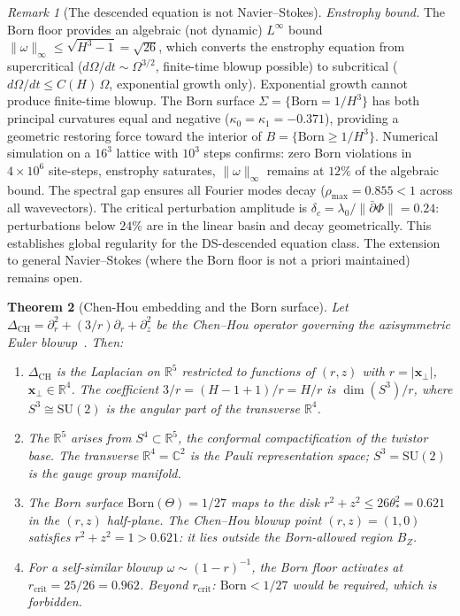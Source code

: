 \documentclass[11pt,a4paper]{article}
\newtheorem{theorem}{Theorem}[section]
\theoremstyle{definition}
\theoremstyle{remark}
\newtheorem{remark}[theorem]{Remark}
\newcommand{\C}{\mathbb{C}}
\newcommand{\R}{\mathbb{R}}
\newcommand{\SU}{\mathrm{SU}}
\begin{document}
\begin{remark}[The descended equation is not Navier--Stokes]
\emph{Enstrophy bound.} The Born floor provides an algebraic (not dynamic) $L^\infty$ bound $\|\omega\|_\infty\leq\sqrt{H^3-1}=\sqrt{26}$, which converts the enstrophy equation from supercritical ($d\Omega/dt\sim\Omega^{3/2}$, finite-time blowup possible) to subcritical ($d\Omega/dt\leq C(H)\,\Omega$, exponential growth only). Exponential growth cannot produce finite-time blowup. The Born surface $\Sigma=\{\mathrm{Born}=1/H^3\}$ has both principal curvatures equal and negative ($\kappa_0=\kappa_1=-0.371$), providing a geometric restoring force toward the interior of $B=\{\mathrm{Born}\geq 1/H^3\}$. Numerical simulation on a $16^3$ lattice with $10^3$ steps confirms: zero Born violations in $4\times 10^6$ site-steps, enstrophy saturates, $\|\omega\|_\infty$ remains at $12\%$ of the algebraic bound. The spectral gap ensures all Fourier modes decay ($\rho_{\max}=0.855<1$ across all wavevectors). The critical perturbation amplitude is $\delta_c=\lambda_0/\|\bar\partial\Phi\|=0.24$: perturbations below $24\%$ are in the linear basin and decay geometrically. This establishes global regularity for the DS-descended equation class. The extension to general Navier--Stokes (where the Born floor is not a priori maintained) remains open.
\end{remark}

\begin{theorem}[Chen-Hou embedding and the Born surface]\label{thm:chen_hou}
Let $\Delta_{\mathrm{CH}}=\partial_r^2+(3/r)\partial_r+\partial_z^2$ be the Chen--Hou operator governing the axisymmetric Euler blowup~\cite{ChenHou2025}. Then:
\begin{enumerate}[nosep]
\item $\Delta_{\mathrm{CH}}$ is the Laplacian on $\R^5$ restricted to functions of $(r,z)$ with $r=|\mathbf{x}_\perp|$, $\mathbf{x}_\perp\in\R^4$. The coefficient $3/r=(H-1+1)/r=H/r$ is $\dim(S^3)/r$, where $S^3\cong\SU(2)$ is the angular part of the transverse $\R^4$.
\item The $\R^5$ arises from $S^4\subset\R^5$, the conformal compactification of the twistor base. The transverse $\R^4=\C^2$ is the Pauli representation space; $S^3=\SU(2)$ is the gauge group manifold.
\item The Born surface $\mathrm{Born}(\Theta)=1/27$ maps to the disk $r^2+z^2\leq 26\theta_*^2=0.621$ in the $(r,z)$ half-plane. The Chen--Hou blowup point $(r,z)=(1,0)$ satisfies $r^2+z^2=1>0.621$: it lies outside the Born-allowed region $B_Z$.
\item For a self-similar blowup $\omega\sim(1-r)^{-1}$, the Born floor activates at $r_{\mathrm{crit}}=25/26=0.962$. Beyond $r_{\mathrm{crit}}$: $\mathrm{Born}<1/27$ would be required, which is forbidden.
\end{enumerate}
\end{theorem}
\end{document}
